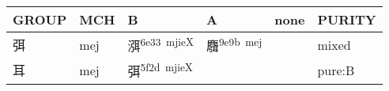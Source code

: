 \documentclass[14pt,a4paper]{scrartcl}
\begin{document}
\begin{longtable}[c]{@{}llllll@{}}
\toprule
\begin{minipage}[b]{0.14\columnwidth}\raggedright\strut
GROUP
\strut\end{minipage} &
\begin{minipage}[b]{0.14\columnwidth}\raggedright\strut
MCH
\strut\end{minipage} &
\begin{minipage}[b]{0.14\columnwidth}\raggedright\strut
B
\strut\end{minipage} &
\begin{minipage}[b]{0.14\columnwidth}\raggedright\strut
A
\strut\end{minipage} &
\begin{minipage}[b]{0.14\columnwidth}\raggedright\strut
none
\strut\end{minipage} &
\begin{minipage}[b]{0.14\columnwidth}\raggedright\strut
PURITY
\strut\end{minipage}\tabularnewline
\midrule
\endhead
\begin{minipage}[t]{0.14\columnwidth}\raggedright\strut
弭
\strut\end{minipage} &
\begin{minipage}[t]{0.14\columnwidth}\raggedright\strut
mej
\strut\end{minipage} &
\begin{minipage}[t]{0.14\columnwidth}\raggedright\strut
渳\textsuperscript{6e33~mjieX}
\strut\end{minipage} &
\begin{minipage}[t]{0.14\columnwidth}\raggedright\strut
麛\textsuperscript{9e9b~mej}
\strut\end{minipage} &
\begin{minipage}[t]{0.14\columnwidth}\raggedright\strut
\strut\end{minipage} &
\begin{minipage}[t]{0.14\columnwidth}\raggedright\strut
mixed
\strut\end{minipage}\tabularnewline
\begin{minipage}[t]{0.14\columnwidth}\raggedright\strut
耳
\strut\end{minipage} &
\begin{minipage}[t]{0.14\columnwidth}\raggedright\strut
mej
\strut\end{minipage} &
\begin{minipage}[t]{0.14\columnwidth}\raggedright\strut
弭\textsuperscript{5f2d~mjieX}
\strut\end{minipage} &
\begin{minipage}[t]{0.14\columnwidth}\raggedright\strut
\strut\end{minipage} &
\begin{minipage}[t]{0.14\columnwidth}\raggedright\strut
\strut\end{minipage} &
\begin{minipage}[t]{0.14\columnwidth}\raggedright\strut
pure:B
\strut\end{minipage}\tabularnewline
\bottomrule
\end{longtable}
\end{document}
